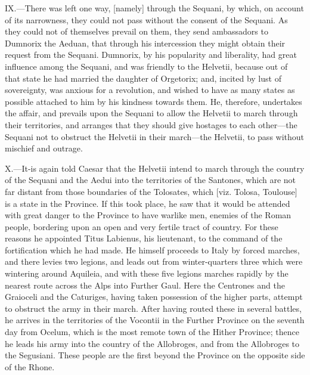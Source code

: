 IX.—There was left one way, [namely] through the Sequani, by which, on
account of its narrowness, they could not pass without the consent of
the Sequani. As they could not of themselves prevail on them, they send
ambassadors to Dumnorix the Aeduan, that through his intercession they
might obtain their request from the Sequani. Dumnorix, by his popularity
and liberality, had great influence among the Sequani, and was friendly
to the Helvetii, because out of that state he had married the daughter
of Orgetorix; and, incited by lust of sovereignty, was anxious for a
revolution, and wished to have as many states as possible attached to
him by his kindness towards them. He, therefore, undertakes the affair,
and prevails upon the Sequani to allow the Helvetii to march through
their territories, and arranges that they should give hostages to each
other—the Sequani not to obstruct the Helvetii in their march—the
Helvetii, to pass without mischief and outrage.

X.—It-is again told Caesar that the Helvetii intend to march through
the country of the Sequani and the Aedui into the territories of the
Santones, which are not far distant from those boundaries of the
Tolosates, which [viz. Tolosa, Toulouse] is a state in the Province. If
this took place, he saw that it would be attended with great danger to
the Province to have warlike men, enemies of the Roman people, bordering
upon an open and very fertile tract of country. For these reasons he
appointed Titus Labienus, his lieutenant, to the command of the
fortification which he had made. He himself proceeds to Italy by forced
marches, and there levies two legions, and leads out from winter-quarters
three which were wintering around Aquileia, and with these five
legions marches rapidly by the nearest route across the Alps into
Further Gaul. Here the Centrones and the Graioceli and the Caturiges,
having taken possession of the higher parts, attempt to obstruct the
army in their march. After having routed these in several battles, he
arrives in the territories of the Vocontii in the Further Province on
the seventh day from Ocelum, which is the most remote town of the Hither
Province; thence he leads his army into the country of the Allobroges,
and from the Allobroges to the Segusiani. These people are the first
beyond the Province on the opposite side of the Rhone.

